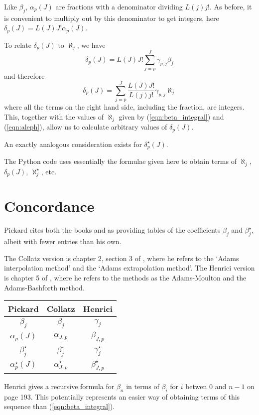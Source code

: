 \documentclass{article}
\begin{document}
Like $\beta_{j}$, $\alpha_{p}(J)$ are fractions with a denominator dividing $L(j)j!$.
As before, it is convenient to multiply out by this denominator to get integers, here $\delta_p(J) = L(J)J! \alpha_p(J)$.

To relate $\delta_p(J)$ to $\aleph_j$, we have
\[ \delta_p(J) = L(J)J! \sum_{j=p}^{J} \gamma_{p, j} \beta_{j} \]
and therefore
\[ \delta_p(J) = \sum_{j=p}^{J} \frac{L(J)J!}{L(j)j!} \gamma_{p, j} \aleph_{j} \]
where all the terms on the right hand side, including the fraction, are integers.
This, together with the values of $\aleph_{j}$ given by (\ref{eqn:beta_integral}) and (\ref{eqn:aleph}), allow us to calculate arbitrary values of $\delta_p(J)$.

An exactly analogous consideration exists for $\delta^{\star}_p(J)$.

The Python code \cite{python} uses essentially the formulae given here to obtain terms of $\aleph_j$, $\delta_p(J)$, $\aleph^{\star}_j$, etc.

\section{Concordance}
Pickard cites both the books \cite{collatz} and \cite{henrici} as providing tables of the coefficients $\beta_j$ and $\beta^{\star}_j$, albeit with fewer entries than his own.

The Collatz version is chapter 2, section 3 of \cite{collatz}, where he refers to the `Adams interpolation method' and the `Adams extrapolation method'. The Henrici version is chapter 5 of \cite{henrici}, where he refers to the methods as the Adams-Moulton and the Adams-Bashforth method.

\begin{center}
\begin{tabular}{|c|c|c|}
\hline
Pickard \cite{pickard} & Collatz \cite{collatz} & Henrici \cite{henrici} \\ 
\hline
$\beta_j$ & $\beta_j$ & $\gamma_j$ \\
$\alpha_p(J)$ & $\alpha_{J, p}$ & $\beta_{J, p}$ \\
$\beta^{\star}_j$ & $\beta_j^{\star}$ & $\gamma^{\star}_j$ \\
$\alpha^{\star}_p(J)$ & $\alpha^{\star}_{J, p}$ & $\beta^{\star}_{J, p}$ \\
\hline
\end{tabular}
\end{center}

Henrici gives a recursive formula for $\beta_n$ in terms of $\beta_i$ for $i$ betwen $0$ and $n-1$ on page 193. This potentially represents an easier way of obtaining terms of this sequence than (\ref{eqn:beta_integral}).
\end{document}

